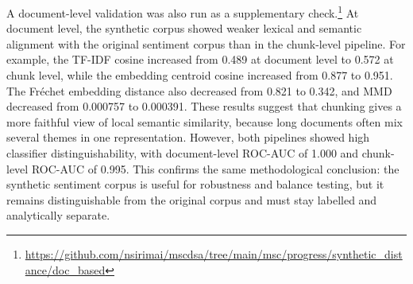 \documentclass{article}
\begin{document}
A document-level validation was also run as a supplementary
check.\footnote{\url{https://github.com/nsirimai/mscdsa/tree/main/msc/progress/synthetic_distance/doc_based}}
At document level, the synthetic corpus showed weaker lexical and semantic alignment
with the original sentiment corpus than in the chunk-level pipeline. For example, the
TF-IDF cosine increased from 0.489 at document level to 0.572 at chunk level, while
the embedding centroid cosine increased from 0.877 to 0.951. The Fréchet embedding
distance also decreased from 0.821 to 0.342, and MMD decreased from 0.000757 to
0.000391. These results suggest that chunking gives a more faithful view of local
semantic similarity, because long documents often mix several themes in one
representation. However, both pipelines showed high classifier distinguishability,
with document-level ROC-AUC of 1.000 and chunk-level ROC-AUC of 0.995. This confirms
the same methodological conclusion: the synthetic sentiment corpus is useful for
robustness and balance testing, but it remains distinguishable from the original
corpus and must stay labelled and analytically separate.







\newpage


\end{document}

